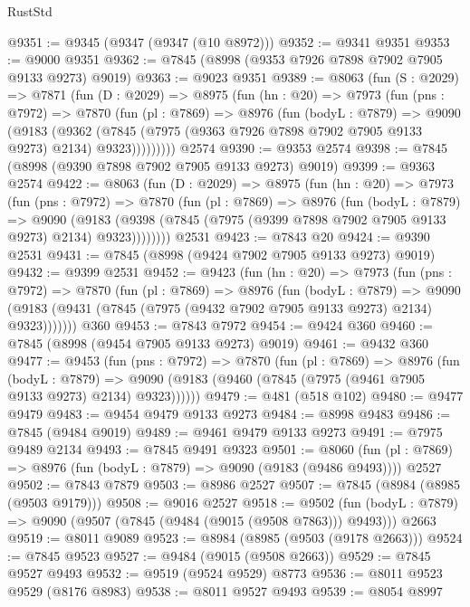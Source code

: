 \begin{lexlean}{RustStd}
\begin{coremodule}
@9351 := @9345 (@9347 (@9347 (@10 @8972)))
@9352 := @9341 @9351
@9353 := @9000 @9351
@9362 := @7845 (@8998 (@9353 @7926 @7898 @7902 @7905 @9133 @9273) @9019)
@9363 := @9023 @9351
@9389 := @8063
    (fun (S : @2029) =>
    @7871
      (fun (D : @2029) =>
      @8975
        (fun (hn : @20) =>
        @7973
          (fun (pns : @7972) =>
          @7870
            (fun (pl : @7869) =>
            @8976
              (fun (bodyL : @7879) =>
              @9090
                (@9183
                  (@9362
                    (@7845 (@7975 (@9363 @7926 @7898 @7902 @7905 @9133 @9273) @2134) @9323)))))))))
    @2574
@9390 := @9353 @2574
@9398 := @7845 (@8998 (@9390 @7898 @7902 @7905 @9133 @9273) @9019)
@9399 := @9363 @2574
@9422 := @8063
    (fun (D : @2029) =>
    @8975
      (fun (hn : @20) =>
      @7973
        (fun (pns : @7972) =>
        @7870
          (fun (pl : @7869) =>
          @8976
            (fun (bodyL : @7879) =>
            @9090
              (@9183 (@9398 (@7845 (@7975 (@9399 @7898 @7902 @7905 @9133 @9273) @2134) @9323))))))))
    @2531
@9423 := @7843 @20
@9424 := @9390 @2531
@9431 := @7845 (@8998 (@9424 @7902 @7905 @9133 @9273) @9019)
@9432 := @9399 @2531
@9452 := @9423
    (fun (hn : @20) =>
    @7973
      (fun (pns : @7972) =>
      @7870
        (fun (pl : @7869) =>
        @8976
          (fun (bodyL : @7879) =>
          @9090 (@9183 (@9431 (@7845 (@7975 (@9432 @7902 @7905 @9133 @9273) @2134) @9323)))))))
    @360
@9453 := @7843 @7972
@9454 := @9424 @360
@9460 := @7845 (@8998 (@9454 @7905 @9133 @9273) @9019)
@9461 := @9432 @360
@9477 := @9453
    (fun (pns : @7972) =>
    @7870
      (fun (pl : @7869) =>
      @8976
        (fun (bodyL : @7879) =>
        @9090 (@9183 (@9460 (@7845 (@7975 (@9461 @7905 @9133 @9273) @2134) @9323))))))
@9479 := @481 (@518 @102)
@9480 := @9477 @9479
@9483 := @9454 @9479 @9133 @9273
@9484 := @8998 @9483
@9486 := @7845 (@9484 @9019)
@9489 := @9461 @9479 @9133 @9273
@9491 := @7975 @9489 @2134
@9493 := @7845 @9491 @9323
@9501 := @8060
    (fun (pl : @7869) => @8976 (fun (bodyL : @7879) => @9090 (@9183 (@9486 @9493))))
    @2527
@9502 := @7843 @7879
@9503 := @8986 @2527
@9507 := @7845 (@8984 (@8985 (@9503 @9179)))
@9508 := @9016 @2527
@9518 := @9502
    (fun (bodyL : @7879) => @9090 (@9507 (@7845 (@9484 (@9015 (@9508 @7863))) @9493)))
    @2663
@9519 := @8011 @9089
@9523 := @8984 (@8985 (@9503 (@9178 @2663)))
@9524 := @7845 @9523
@9527 := @9484 (@9015 (@9508 @2663))
@9529 := @7845 @9527 @9493
@9532 := @9519 (@9524 @9529) @8773
@9536 := @8011 @9523 @9529 (@8176 @8983)
@9538 := @8011 @9527 @9493
@9539 := @8054 @8997

\end{coremodule}
\end{lexlean}
